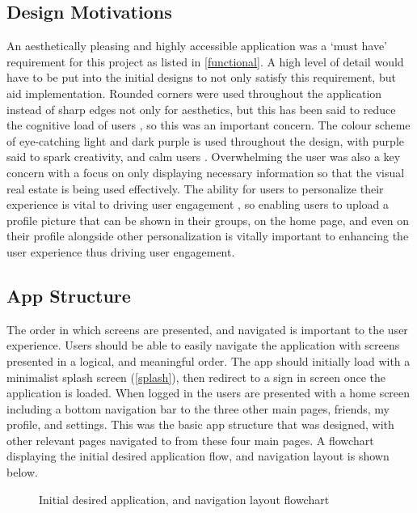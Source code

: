 \subsection*{Design Motivations}
An aesthetically pleasing and highly accessible application was a `must have' requirement for this project as listed in \ref{functional}. A high level of detail would have to be put into the initial designs to not only satisfy this requirement, but aid implementation. Rounded corners were used throughout the application instead of sharp edges not only for aesthetics, but this has been said to reduce the cognitive load of users \cite{roundedCorners}, so this was an important concern. The colour scheme of eye-catching light and dark purple is used throughout the design, with purple said to spark creativity, and calm users \cite{purplePsych}. Overwhelming the user was also a key concern with a focus on only displaying necessary information so that the visual real estate is being used effectively. The ability for users to personalize their experience is vital to driving user engagement \cite{customUserEng}, so enabling users to upload a profile picture that can be shown in their groups, on the home page, and even on their profile alongside other personalization is vitally important to enhancing the user experience thus driving user engagement. 

\subsection*{App Structure}
The order in which screens are presented, and navigated is important to the user experience. Users should be able to easily navigate the application with screens presented in a logical, and meaningful order. The app should initially load with a minimalist splash screen (\ref{splash}), then redirect to a sign in screen once the application is loaded. When logged in the users are presented with a home screen including a bottom navigation bar to the three other main pages, friends, my profile, and settings. This was the basic app structure that was designed, with other relevant pages navigated to from these four main pages. A flowchart displaying the initial desired application flow, and navigation layout is shown below. 

\begin{figure}[!htbp]
    \centering
    \begin{subfigure}[b]{0.6\textwidth}
    \end{subfigure}
    \caption{Initial desired application, and navigation layout flowchart} 
    \label{fig:layoutFlow}
\end{figure}
\FloatBarrier

